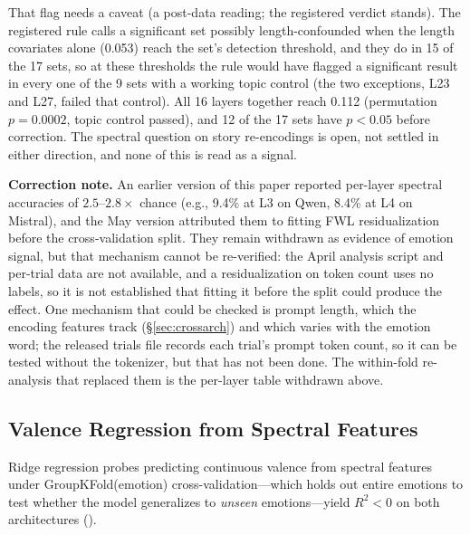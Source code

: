 \documentclass[11pt,a4paper]{article}
\begin{document}
That flag needs a caveat (a post-data reading; the registered verdict stands). The registered rule calls a significant set possibly length-confounded when the length covariates alone (0.053) reach the set's detection threshold, and they do in 15 of the 17 sets, so at these thresholds the rule would have flagged a significant result in every one of the 9 sets with a working topic control (the two exceptions, L23 and L27, failed that control). All 16 layers together reach 0.112 (permutation $p = 0.0002$, topic control passed), and 12 of the 17 sets have $p < 0.05$ before correction. The spectral question on story re-encodings is open, not settled in either direction, and none of this is read as a signal.

\textbf{Correction note.} An earlier version of this paper reported per-layer spectral accuracies of $2.5$--$2.8\times$ chance (e.g., 9.4\% at L3 on Qwen, 8.4\% at L4 on Mistral), and the May version attributed them to fitting FWL residualization before the cross-validation split. They remain withdrawn as evidence of emotion signal, but that mechanism cannot be re-verified: the April analysis script and per-trial data are not available, and a residualization on token count uses no labels, so it is not established that fitting it before the split could produce the effect. One mechanism that could be checked is prompt length, which the encoding features track (\S\ref{sec:crossarch}) and which varies with the emotion word; the released trials file records each trial's prompt token count, so it can be tested without the tokenizer, but that has not been done. The within-fold re-analysis that replaced them is the per-layer table withdrawn above.

\subsection{Valence Regression from Spectral Features}

Ridge regression probes predicting continuous valence from spectral features under GroupKFold(emotion) cross-validation---which holds out entire emotions to test whether the model generalizes to \emph{unseen} emotions---yield $R^2 < 0$ on both architectures ().
\end{document}
